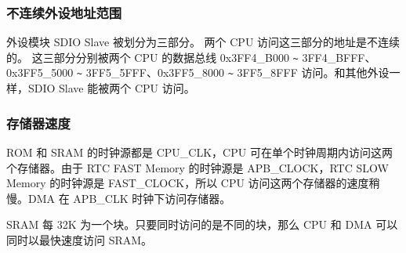 \documentclass[main\_\_CN.tex]{subfiles}
\begin{document}
\subsubsection{不连续外设地址范围}


\hypertarget{SDIO_Slave_split_three_part}{}
外设模块 SDIO Slave 被划分为三部分。
两个 CPU 访问这三部分的地址是不连续的。
这三部分分别被两个 CPU 的数据总线 0x3FF4\_B000 \verb+~+ 3FF4\_BFFF、0x3FF5\_5000 \verb+~+ 3FF5\_5FFF、0x3FF5\_8000 \verb+~+ 3FF5\_8FFF 访问。和其他外设一样，SDIO Slave 能被两个 CPU 访问。

\subsubsection{存储器速度}
ROM 和 SRAM 的时钟源都是 CPU\_CLK，CPU 可在单个时钟周期内访问这两个存储器。由于 RTC FAST Memory 的时钟源是 APB\_CLOCK，RTC SLOW Memory 的时钟源是 FAST\_CLOCK，所以 CPU 访问这两个存储器的速度稍慢。DMA 在 APB\_CLK 时钟下访问存储器。

SRAM 每 32K 为一个块。只要同时访问的是不同的块，那么 CPU 和 DMA 可以同时以最快速度访问 SRAM。
\end{document}
